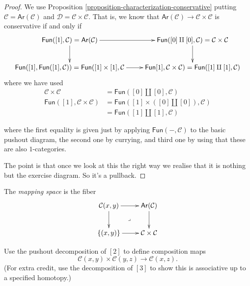 \begin{proof}
We use Proposition \ref{proposition-characterization-conservative}
putting $\mathcal{C}=\mathsf{Ar}(\mathcal{C})$ and
$\mathcal{D}=\mathcal{C} \times \mathcal{C}$.
That is, we know that 
$\mathsf{Ar}(\mathcal{C}) \to \mathcal{C} \times \mathcal{C}$ 
is conservative if and only if
$$
\xymatrix{
\mathsf{Fun}([1],\mathcal{C})=\mathsf{Ar}(\mathcal{C})\ar[r]\ar[d]&
\mathsf{Fun}([0]\amalg [0],\mathcal{C})=\mathcal{C}\times\mathcal{C}\ar[d]\\
\mathsf{Fun}([1],\mathsf{Fun}([1],\mathcal{C}))
=\mathsf{Fun}([1]\times[1],\mathcal{C}\ar[r]&
\mathsf{Fun}[1],\mathcal{C} \times\mathcal{C})
=\mathsf{Fun}([1]\amalg[1],\mathcal{C})
}
$$
where we have used
\begin{align*}
\mathcal{C}\times\mathcal{C}&=\mathsf{Fun}([0]\amalg[0],\mathcal{C})\\
\mathsf{Fun}([1],\mathcal{C}\times\mathcal{C})
&=\mathsf{Fun}([1]\times([0]\amalg[0]),\mathcal{C})\\
&=\mathsf{Fun}([1]\amalg[1],\mathcal{C})
\end{align*}

\noindent
where the first equality is given
just by applying $\mathsf{Fun}(-,\mathcal{C})$
to the basic pushout diagram,
the second one by currying,
and third one by
using that these are also $1$-categories.

The point is that once
we look at this the right way
we realise that it is nothing but 
the exercise diagram. So it's a pullback.
\end{proof}

\begin{definition}
\label{definition-mapping-space}
The {\it mapping space} is the fiber
$$
\xymatrix{
\mathcal{C}(x,y)\ar[r]\ar[d]\ar@{}[dr]|-{\lrcorner}
&\mathsf{Ar}(\mathcal{C})\ar[d]\\
\{(x,y)\}\ar[r]&\mathcal{C}\times\mathcal{C}
}
$$
\end{definition}

\begin{exercise}
\label{exercise-compositions}
Use the pushout decomposition of $[2]$ 
to define composition maps
$$
\mathcal{C}(x,y)\times\mathcal{C}(y,z)\to\mathcal{C}(x,z).
$$
(For extra credit, use the decomposition
of $[3]$ to show this is associative
up to a specified homotopy.)
\end{exercise}


